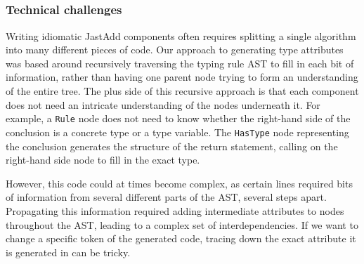 \documentclass[nofilelist]{cslthse-msc}
\newcommand{\CR}[1]{\textcolor{green!60!black}{[\textbf{CR}:#1]}}
\begin{document}

\subsection{\rqthree}

\subsubsection{Technical challenges}
Writing idiomatic JastAdd components often requires splitting a single algorithm into many different pieces of code.
Our approach to generating type attributes was based around recursively traversing the typing rule AST to fill in each bit of information, rather than having one parent node trying to form an understanding of the entire tree.
The plus side of this recursive approach is that each component does not need an intricate understanding of the nodes underneath it.
For example, a \lstinline{Rule} node does not need to know whether the right-hand side of the conclusion is a concrete type or a type variable.
The \lstinline{HasType} node representing the conclusion generates the structure of the return statement, calling on the right-hand side node to fill in the exact type.

However, this code could at times become complex, as certain lines required bits of information from several different parts of the AST, several steps apart.
Propagating this information required adding intermediate attributes to nodes throughout the AST, leading to a complex set of interdependencies.
If we want to change a specific token of the generated code, tracing down the exact attribute it is generated in can be tricky.

\end{document}
